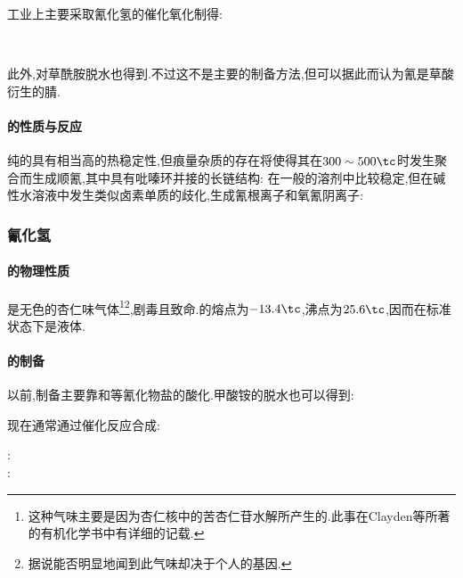 \documentclass{ctexart}
\begin{document}
\indent 工业上主要采取氰化氢的催化氧化制得:
\begin{center}
    \\
\end{center}

\indent 此外,对草酰胺脱水也得到.不过这不是主要的制备方法,但可以据此而认为氰是草酸衍生的腈.
\begin{center}
\end{center}
\paragraph{的性质与反应}
纯的具有相当高的热稳定性,但痕量杂质的存在将使得其在$300\sim500\tc$时发生聚合而生成顺氰,其中具有吡嗪环并接的长链结构:
在一般的溶剂中比较稳定,但在碱性水溶液中发生类似卤素单质的歧化,生成氰根离子和氧氰阴离子:
\begin{center}
\end{center}
\subsubsection{氰化氢}
\paragraph{的物理性质}
是无色的杏仁味气体\footnote{这种气味主要是因为杏仁核中的苦杏仁苷水解所产生的.此事在Clayden等所著的有机化学书中有详细的记载.}\footnote{据说能否明显地闻到此气味却决于个人的基因.},剧毒且致命.的熔点为$-13.4\tc$,沸点为$25.6\tc$,因而在标准状态下是液体.
\paragraph{的制备}
以前,制备主要靠和等氰化物盐的酸化.甲酸铵的脱水也可以得到:
\begin{center}
\end{center}
现在通常通过催化反应合成:
\begin{center}
    :\ \\
    :\ 
\end{center}
\end{document}
